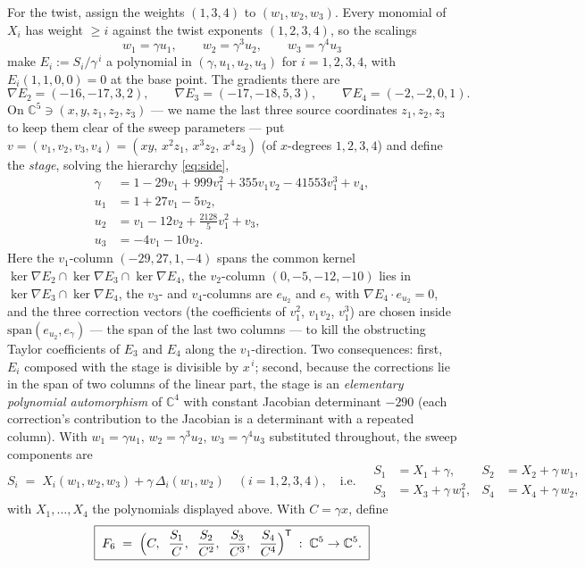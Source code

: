 \documentclass[11pt]{article}
\numberwithin{equation}{section}
\theoremstyle{plain}
\theoremstyle{definition}
\theoremstyle{remark}
\newcommand{\C}{\mathbb{C}}
\begin{document}
For the twist, assign the weights $(1,3,4)$ to $(w_1,w_2,w_3)$. Every monomial of
$X_i$ has weight $\ge i$ against the twist exponents $(1,2,3,4)$, so the
scalings
\[
w_1=\gamma u_1,\qquad w_2=\gamma^3u_2,\qquad w_3=\gamma^4u_3
\]
make $E_i:=S_i/\gamma^{\,i}$ a polynomial in $(\gamma,u_1,u_2,u_3)$ for
$i=1,2,3,4$, with $E_i(1,1,0,0)=0$ at the base point. The gradients there are
\[
\nabla E_2=(-16,-17,3,2),\qquad
\nabla E_3=(-17,-18,5,3),\qquad
\nabla E_4=(-2,-2,0,1).
\]
On $\C^5\ni(x,y,z_1,z_2,z_3)$ --- we name the last three source coordinates
$z_1,z_2,z_3$ to keep them clear of the sweep parameters --- put $v=(v_1,v_2,v_3,v_4)=(xy,\,x^2z_1,\,x^3z_2,\,x^4z_3)$
(of $x$-degrees $1,2,3,4$) and define the \emph{stage}, solving the
hierarchy \eqref{eq:side},
\[
\begin{aligned}
\gamma&=1-29v_1+999v_1^2+355v_1v_2-41553v_1^3+v_4,\\
u_1&=1+27v_1-5v_2,\\
u_2&=v_1-12v_2+\tfrac{2128}{5}v_1^2+v_3,\\
u_3&=-4v_1-10v_2 .
\end{aligned}
\]
Here the $v_1$-column $(-29,27,1,-4)$ spans the common kernel
$\ker\nabla E_2\cap\ker\nabla E_3\cap\ker\nabla E_4$, the $v_2$-column
$(0,-5,-12,-10)$ lies in $\ker\nabla E_3\cap\ker\nabla E_4$, the $v_3$- and
$v_4$-columns are $e_{u_2}$ and $e_\gamma$ with
$\nabla E_4\cdot e_{u_2}=0$, and the three correction vectors (the
coefficients of $v_1^2$, $v_1v_2$, $v_1^3$) are chosen inside
$\mathrm{span}(e_{u_2},e_\gamma)$ --- the span of the last two columns --- to
kill the obstructing Taylor coefficients of $E_3$ and $E_4$ along the
$v_1$-direction. Two consequences: first, $E_i$ composed with the stage is
divisible by $x^{\,i}$; second, because the corrections lie in the span of two
columns of the linear part, the stage is an \emph{elementary polynomial
automorphism} of $\C^4$ with constant Jacobian determinant $-290$ (each
correction's contribution to the Jacobian is a determinant with a repeated
column). With $w_1=\gamma u_1$, $w_2=\gamma^3u_2$, $w_3=\gamma^4u_3$ substituted
throughout, the sweep components are
\[
S_i\;=\;X_i(w_1,w_2,w_3)+\gamma\,\Delta_i(w_1,w_2)\quad(i=1,2,3,4),
\quad\text{i.e.}\quad
\begin{aligned}
S_1&=X_1+\gamma, & S_2&=X_2+\gamma\,w_1,\\
S_3&=X_3+\gamma\,w_1^2, & S_4&=X_4+\gamma\,w_2 ,
\end{aligned}
\]
with $X_1,\dots,X_4$ the polynomials displayed above. With $C=\gamma x$, define
\[
\boxed{\;F_6\;=\;\Bigl(C,\;\;\frac{S_1}{C},\;\;\frac{S_2}{C^2},\;\;
\frac{S_3}{C^3},\;\;\frac{S_4}{C^4}\Bigr)^{\mathsf T}\;:\;\C^5\to\C^5 .\;}
\]
\end{document}
